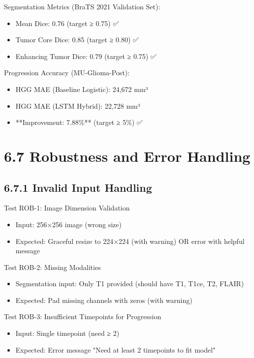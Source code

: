 Segmentation Metrics (BraTS 2021 Validation Set):

\begin{itemize}
  \item Mean Dice: 0.76 (target ≥ 0.75) ✅
  \item Tumor Core Dice: 0.85 (target ≥ 0.80) ✅
  \item Enhancing Tumor Dice: 0.79 (target ≥ 0.75) ✅
\end{itemize}

Progression Accuracy (MU-Glioma-Post):

\begin{itemize}
  \item HGG MAE (Baseline Logistic): 24,672 mm³
  \item HGG MAE (LSTM Hybrid): 22,728 mm³
  \item **Improvement: 7.88\%** (target ≥ 5\%) ✅
\end{itemize}


\section{6.7 Robustness and Error Handling}

\subsection{6.7.1 Invalid Input Handling}
Test ROB-1: Image Dimension Validation

\begin{itemize}
  \item Input: 256×256 image (wrong size)
  \item Expected: Graceful resize to 224×224 (with warning) OR error with helpful message
\end{itemize}

Test ROB-2: Missing Modalities

\begin{itemize}
  \item Segmentation input: Only T1 provided (should have T1, T1ce, T2, FLAIR)
  \item Expected: Pad missing channels with zeros (with warning)
\end{itemize}

Test ROB-3: Insufficient Timepoints for Progression

\begin{itemize}
  \item Input: Single timepoint (need ≥ 2)
  \item Expected: Error message "Need at least 2 timepoints to fit model"
\end{itemize}


